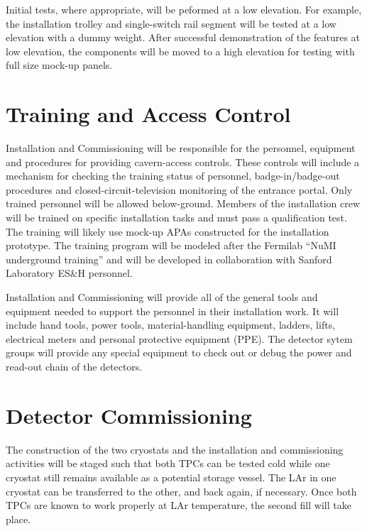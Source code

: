 Initial tests, where appropriate, will be peformed at a low elevation. For example, the installation trolley and single-switch rail segment will be tested at a low elevation with a dummy weight. After successful demonstration of the features  at low elevation, the components will be moved to a high elevation for testing with full size mock-up panels.




\section{Training and Access Control}

Installation and Commissioning will be responsible for the personnel, equipment and procedures for providing cavern-access controls. These controls will include a mechanism for checking the training status of personnel, badge-in/badge-out procedures and closed-circuit-television monitoring of the entrance portal. Only trained personnel will be allowed below-ground. Members of the installation crew will be trained on specific installation tasks and must pass a qualification test. The training will likely use mock-up APAs constructed for the installation prototype. The training program will be modeled after the Fermilab ``NuMI underground training'' and will be developed in collaboration with Sanford Laboratory ES\&H personnel.

Installation and Commissioning will provide all of the general tools and equipment needed to support the personnel in their installation work. It will include hand tools, power tools, material-handling equipment, ladders, lifts, electrical meters and personal protective equipment (PPE). The detector sytem groups will provide any special equipment to check out or debug the power and read-out chain of the detectors.


\section{Detector Commissioning}

The construction  of the two cryostats and the installation and commissioning activities will be staged such that both TPCs can be tested cold while one cryostat still remains available as a potential storage vessel. The LAr in one cryostat can be transferred to the other, and back again, if necessary. Once both TPCs are known to work properly at LAr temperature, the second fill will take place.

